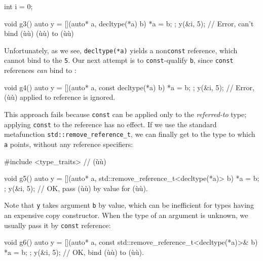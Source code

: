 {\begin{emcppslisting}[emcppsbatch=e9,emcppsstandards={c++14}]
int i = 0;

void g3()
{
    auto y = [](auto* a, decltype(*a) b) { *a = b; };
    y(&i, 5);  // Error, can't bind (ù{}ù) (ù{}ù) to (ù{}ù)
}
\end{emcppslisting}
    

\noindent Unfortunately, as we see, \lstinline!decltype(*a)! yields a
non\lstinline!const!  reference, which cannot bind to the
 \lstinline!5!. Our next attempt is to \lstinline!const!-qualify
\lstinline!b!, since \lstinline!const! references \emph{can} bind to
:

\begin{emcppslisting}[emcppsbatch=e9]
void g4()
{
    auto y = [](auto* a, const decltype(*a) b) { *a = b; };
    y(&i, 5);  // Error, (ù{}ù) applied to reference is ignored.
}
\end{emcppslisting}
    

\noindent This approach fails because \lstinline!const! can be applied only to the
\emph{referred-to} type; applying \lstinline!const! to the reference has no
effect. If we use the standard metafunction
\lstinline!std::remove_reference_t!, we can finally get to the type to
which \lstinline!a! points, without any reference specifiers:

\begin{emcppslisting}[emcppsbatch=e9]
#include <type_traits>  // (ù{}ù)

void g5()
{
    auto y = [](auto* a, std::remove_reference_t<decltype(*a)> b)
    {
        *a = b;
    };
    y(&i, 5); // OK, pass (ù{}ù) by value for (ù{}ù).
}
\end{emcppslisting}
    

\noindent Note that \lstinline!y! takes argument \lstinline!b! by value, which can be
inefficient for types having an expensive copy constructor. When the
type of an argument is unknown, we usually pass it by \lstinline!const!
reference:

\begin{emcppslisting}[emcppsbatch=e9]
void g6()
{
    auto y = [](auto* a, const std::remove_reference_t<decltype(*a)>& b)
    {
        *a = b;
    };
    y(&i, 5); // OK, bind (ù{}ù) to (ù{}ù).
}
\end{emcppslisting}
    

}
